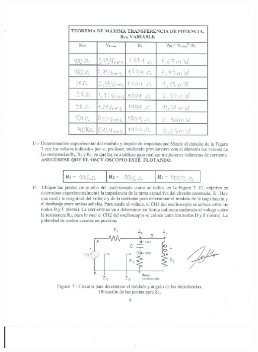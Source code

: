 \documentclass[12pt]{article}
\begin{document}
	\includegraphics[width=16cm,height=21cm]{Img/Resultados_6}\\
\end{document}
